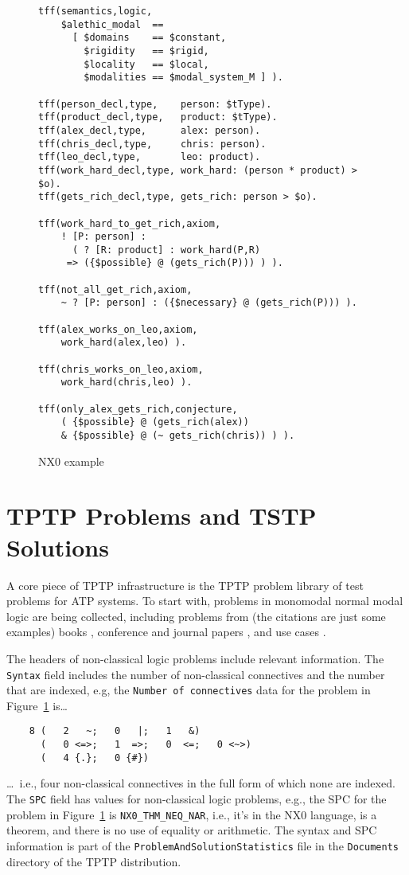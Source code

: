 \documentclass[runningheads]{llncs}
\begin{document}
\begin{figure}[htbp]
\small
{}
\begin{verbatim}
tff(semantics,logic,
    $alethic_modal  ==
      [ $domains    == $constant,
        $rigidity   == $rigid,
        $locality   == $local,
        $modalities == $modal_system_M ] ).

tff(person_decl,type,    person: $tType).
tff(product_decl,type,   product: $tType).
tff(alex_decl,type,      alex: person).
tff(chris_decl,type,     chris: person).
tff(leo_decl,type,       leo: product).
tff(work_hard_decl,type, work_hard: (person * product) > $o).
tff(gets_rich_decl,type, gets_rich: person > $o).

tff(work_hard_to_get_rich,axiom,
    ! [P: person] :
      ( ? [R: product] : work_hard(P,R)
     => ({$possible} @ (gets_rich(P))) ) ).

tff(not_all_get_rich,axiom,
    ~ ? [P: person] : ({$necessary} @ (gets_rich(P))) ).

tff(alex_works_on_leo,axiom,
    work_hard(alex,leo) ).

tff(chris_works_on_leo,axiom,
    work_hard(chris,leo) ).

tff(only_alex_gets_rich,conjecture,
    ( {$possible} @ (gets_rich(alex)) 
    & {$possible} @ (~ gets_rich(chris)) ) ).
\end{verbatim}
\caption{NX0 example}
\label{NX0Example}
\end{figure}

\section{TPTP Problems and TSTP Solutions}
\label{TPTPTSTP}

A core piece of TPTP infrastructure is the TPTP problem library of test problems for ATP systems.
To start with, problems in monomodal normal modal logic are being collected, including problems 
from (the citations are just some examples)
books \cite{For94,FM98,Gir00,Sid10}, 
conference and journal papers \cite{Rei92,FH+98,Sto00,PN+21}, 
and 
use cases \cite{BW14-ECAI,MR22}.

The headers of non-classical logic problems include relevant information.
The {\tt Syntax} field includes the number of non-classical connectives and the 
number that are indexed, e.g,
the {\tt Number of connectives} data for the problem in Figure~\ref{NX0Example} is\ldots
\begin{verbatim}
    8 (   2   ~;   0   |;   1   &)
      (   0 <=>;   1  =>;   0  <=;   0 <~>)
      (   4 {.};   0 {#})
\end{verbatim}
\ldots~i.e., four non-classical connectives in the full form of which none are indexed.
The {\tt SPC} field has values for non-classical logic problems, e.g., the SPC for the problem 
in Figure~\ref{NX0Example} is {\tt NX0\_THM\_NEQ\_NAR}, i.e., it's in the NX0 language, is
a theorem, and there is no use of equality or arithmetic.
The syntax and SPC information is part of the {\tt ProblemAndSolutionStatistics} file in the 
{\tt Documents} directory of the TPTP distribution.
\end{document}
